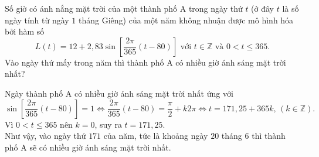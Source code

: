 \begin{bt}%

	Số giờ có ánh nắng mặt trời của một thành phố A trong ngày thứ $t$ (ở đây $t$ là số ngày tính từ ngày $1$ tháng Giêng) của một năm không nhuận được mô hình hóa bởi hàm số
	$$L(t)=12+2{,}83\sin\left[\dfrac{2\pi}{365}(t-80)\right]\text{ với } t\in \mathbb{Z} \text{ và } 0<t\le 365.$$
	Vào ngày thứ mấy  trong năm thì thành phố A có nhiều giờ ánh sáng mặt trời nhất?
	
	\loigiai 
	{
		Ngày thành phố A có nhiều giờ ánh sáng mặt trời nhất ứng với 
		$$\sin\left[\dfrac{2\pi}{365}(t-80)\right]=1\Leftrightarrow\dfrac{2\pi}{365}(t-80)=\dfrac{\pi}{2}+k2\pi\Leftrightarrow t=171{,}25+365k,\,(k\in\mathbb{Z}).$$
		Vì $0<t\le 365$ nên $k=0$, suy ra $t=171{,}25$.\\
		Như vậy, vào ngày thứ $171$ của năm, tức là khoảng ngày $20$ tháng $6$ thì thành phố A sẽ có nhiều giờ ánh sáng mặt trời nhất.
	}
\end{bt}

